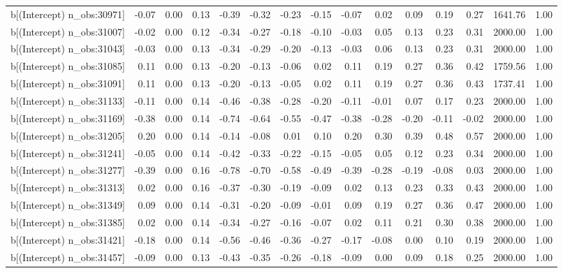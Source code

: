 \begin{table}[ht]
\begin{tabular}{rrrrrrrrrrrrrrr}
  b[(Intercept) n\_obs:30971] & -0.07 & 0.00 & 0.13 & -0.39 & -0.32 & -0.23 & -0.15 & -0.07 & 0.02 & 0.09 & 0.19 & 0.27 & 1641.76 & 1.00 \\ 
  b[(Intercept) n\_obs:31007] & -0.02 & 0.00 & 0.12 & -0.34 & -0.27 & -0.18 & -0.10 & -0.03 & 0.05 & 0.13 & 0.23 & 0.31 & 2000.00 & 1.00 \\ 
  b[(Intercept) n\_obs:31043] & -0.03 & 0.00 & 0.13 & -0.34 & -0.29 & -0.20 & -0.13 & -0.03 & 0.06 & 0.13 & 0.23 & 0.31 & 2000.00 & 1.00 \\ 
  b[(Intercept) n\_obs:31085] & 0.11 & 0.00 & 0.13 & -0.20 & -0.13 & -0.06 & 0.02 & 0.11 & 0.19 & 0.27 & 0.36 & 0.42 & 1759.56 & 1.00 \\ 
  b[(Intercept) n\_obs:31091] & 0.11 & 0.00 & 0.13 & -0.20 & -0.13 & -0.05 & 0.02 & 0.11 & 0.19 & 0.27 & 0.36 & 0.43 & 1737.41 & 1.00 \\ 
  b[(Intercept) n\_obs:31133] & -0.11 & 0.00 & 0.14 & -0.46 & -0.38 & -0.28 & -0.20 & -0.11 & -0.01 & 0.07 & 0.17 & 0.23 & 2000.00 & 1.00 \\ 
  b[(Intercept) n\_obs:31169] & -0.38 & 0.00 & 0.14 & -0.74 & -0.64 & -0.55 & -0.47 & -0.38 & -0.28 & -0.20 & -0.11 & -0.02 & 2000.00 & 1.00 \\ 
  b[(Intercept) n\_obs:31205] & 0.20 & 0.00 & 0.14 & -0.14 & -0.08 & 0.01 & 0.10 & 0.20 & 0.30 & 0.39 & 0.48 & 0.57 & 2000.00 & 1.00 \\ 
  b[(Intercept) n\_obs:31241] & -0.05 & 0.00 & 0.14 & -0.42 & -0.33 & -0.22 & -0.15 & -0.05 & 0.05 & 0.12 & 0.23 & 0.34 & 2000.00 & 1.00 \\ 
  b[(Intercept) n\_obs:31277] & -0.39 & 0.00 & 0.16 & -0.78 & -0.70 & -0.58 & -0.49 & -0.39 & -0.28 & -0.19 & -0.08 & 0.03 & 2000.00 & 1.00 \\ 
  b[(Intercept) n\_obs:31313] & 0.02 & 0.00 & 0.16 & -0.37 & -0.30 & -0.19 & -0.09 & 0.02 & 0.13 & 0.23 & 0.33 & 0.43 & 2000.00 & 1.00 \\ 
  b[(Intercept) n\_obs:31349] & 0.09 & 0.00 & 0.14 & -0.31 & -0.20 & -0.09 & -0.01 & 0.09 & 0.19 & 0.27 & 0.36 & 0.47 & 2000.00 & 1.00 \\ 
  b[(Intercept) n\_obs:31385] & 0.02 & 0.00 & 0.14 & -0.34 & -0.27 & -0.16 & -0.07 & 0.02 & 0.11 & 0.21 & 0.30 & 0.38 & 2000.00 & 1.00 \\ 
  b[(Intercept) n\_obs:31421] & -0.18 & 0.00 & 0.14 & -0.56 & -0.46 & -0.36 & -0.27 & -0.17 & -0.08 & 0.00 & 0.10 & 0.19 & 2000.00 & 1.00 \\ 
  b[(Intercept) n\_obs:31457] & -0.09 & 0.00 & 0.13 & -0.43 & -0.35 & -0.26 & -0.18 & -0.09 & 0.00 & 0.09 & 0.18 & 0.25 & 2000.00 & 1.00 \\ 

\end{tabular}
\end{table}
